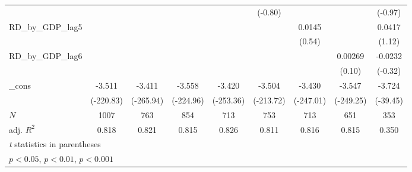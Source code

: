 {\begin{tabular}{l*{8}{c}}
          &                  &                  &                  &                  &  (-0.80)         &                  &                  &  (-0.97)         \\
\addlinespace
RD\_by\_GDP\_lag5&                  &                  &                  &                  &                  &   0.0145         &                  &   0.0417         \\
          &                  &                  &                  &                  &                  &   (0.54)         &                  &   (1.12)         \\
\addlinespace
RD\_by\_GDP\_lag6&                  &                  &                  &                  &                  &                  &  0.00269         &  -0.0232         \\
          &                  &                  &                  &                  &                  &                  &   (0.10)         &  (-0.32)         \\
\addlinespace
\_cons    &   -3.511\sym{***}&   -3.411\sym{***}&   -3.558\sym{***}&   -3.420\sym{***}&   -3.504\sym{***}&   -3.430\sym{***}&   -3.547\sym{***}&   -3.724\sym{***}\\
          &(-220.83)         &(-265.94)         &(-224.96)         &(-253.36)         &(-213.72)         &(-247.01)         &(-249.25)         & (-39.45)         \\
\midrule
\(N\)     &     1007         &      763         &      854         &      713         &      753         &      713         &      651         &      353         \\
adj. \(R^{2}\)&    0.818         &    0.821         &    0.815         &    0.826         &    0.811         &    0.816         &    0.815         &    0.350         \\
\bottomrule
\multicolumn{9}{l}{\footnotesize \textit{t} statistics in parentheses}\\
\multicolumn{9}{l}{\footnotesize \sym{*} \(p<0.05\), \sym{**} \(p<0.01\), \sym{***} \(p<0.001\)}\\
\end{tabular}
}
